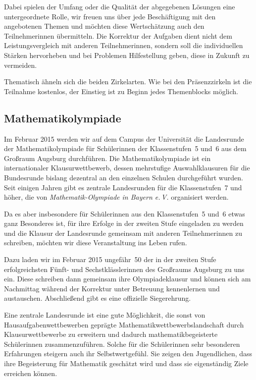 \documentclass[12pt]{zettel}
\begin{document}
Dabei spielen der Umfang oder die Qualität der abgegebenen Lösungen eine untergeordnete Rolle, wir freuen uns über jede Beschäftigung
mit den angebotenen Themen und möchten diese Wertschätzung auch den Teilnehmerinnen übermitteln. Die Korrektur der Aufgaben dient nicht dem Leistungsvergleich mit anderen
Teilnehmerinnen, sondern soll die individuellen Stärken hervorheben und bei Problemen Hilfestellung geben, diese in Zukunft zu vermeiden.

Thematisch ähneln sich die beiden Zirkelarten. Wie bei den
Präsenzzirkeln ist die Teilnahme kostenlos, der Einstieg ist zu Beginn jedes Themenblocks möglich.


\subsection{Mathematikolympiade}

Im Februar 2015 werden wir auf dem Campus der Universität die Landesrunde der Mathematikolympiade für Schülerinnen der Klassenstufen~5 und~6 aus dem Großraum
Augsburg durchführen. Die Mathematikolympiade ist ein internationaler Klausurwettbewerb, dessen mehrstufige Auswahlklausuren für die Bundesrunde
bislang dezentral an den einzelnen Schulen durchgeführt wurden. Seit einigen
Jahren gibt es zentrale Landesrunden für die Klassenstufen~7 und höher, die von
\emph{Mathematik-Olympiade in Bayern e.\,V.} organisiert werden.

Da es aber insbesondere für Schülerinnen aus den Klassenstufen~5
und~6 etwas ganz Besonderes ist, für ihre Erfolge in der zweiten Stufe
eingeladen zu werden und die Klausur der Landesrunde gemeinsam mit anderen
Teilnehmerinnen zu schreiben, möchten wir diese Veranstaltung
ins Leben rufen.

Dazu laden wir im Februar 2015 ungefähr~50 der in der zweiten Stufe
erfolgreichsten Fünft- und Sechstklässlerinnen des Großraums
Augsburg zu uns ein. Diese schreiben dann gemeinsam ihre Olympiadeklausur und
können sich am Nachmittag während der Korrektur unter Betreuung kennenlernen
und austauschen. Abschließend gibt es eine offizielle Siegerehrung.

Eine zentrale Landesrunde ist eine gute Möglichkeit, die sonst von
Hausaufgabenwettbewerben geprägte Mathematikwettbewerbslandschaft durch
Klausurwettbewerbe zu erweitern und dadurch mathematikbegeisterte Schülerinnen
zusammenzuführen. Solche für die Schülerinnen
sehr besonderen Erfahrungen steigern auch ihr Selbstwertgefühl. Sie zeigen
den Jugendlichen, dass ihre Begeisterung für Mathematik geschätzt wird und dass sie eigenständig Ziele erreichen können.
\end{document}
